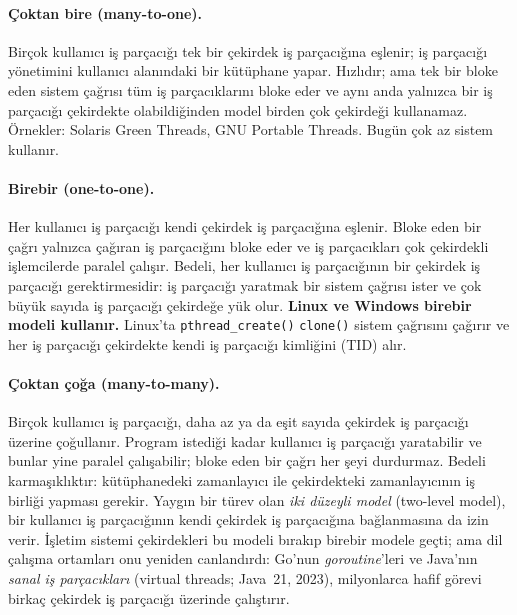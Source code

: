 \documentclass[11pt,a4paper]{article}
\newcommand{\cmd}[1]{\texttt{#1}}
\begin{document}
\paragraph{Çoktan bire (many-to-one).} Birçok kullanıcı iş parçacığı tek bir çekirdek iş parçacığına eşlenir; iş parçacığı yönetimini kullanıcı alanındaki bir kütüphane yapar. Hızlıdır; ama tek bir bloke eden sistem çağrısı tüm iş parçacıklarını bloke eder ve aynı anda yalnızca bir iş parçacığı çekirdekte olabildiğinden model birden çok çekirdeği kullanamaz. Örnekler: Solaris Green Threads, GNU Portable Threads. Bugün çok az sistem kullanır.

\paragraph{Birebir (one-to-one).} Her kullanıcı iş parçacığı kendi çekirdek iş parçacığına eşlenir. Bloke eden bir çağrı yalnızca çağıran iş parçacığını bloke eder ve iş parçacıkları çok çekirdekli işlemcilerde paralel çalışır. Bedeli, her kullanıcı iş parçacığının bir çekirdek iş parçacığı gerektirmesidir: iş parçacığı yaratmak bir sistem çağrısı ister ve çok büyük sayıda iş parçacığı çekirdeğe yük olur. \textbf{Linux ve Windows birebir modeli kullanır.} Linux'ta \cmd{pthread\_create()} \cmd{clone()} sistem çağrısını çağırır ve her iş parçacığı çekirdekte kendi iş parçacığı kimliğini (TID) alır.

\paragraph{Çoktan çoğa (many-to-many).} Birçok kullanıcı iş parçacığı, daha az ya da eşit sayıda çekirdek iş parçacığı üzerine çoğullanır. Program istediği kadar kullanıcı iş parçacığı yaratabilir ve bunlar yine paralel çalışabilir; bloke eden bir çağrı her şeyi durdurmaz. Bedeli karmaşıklıktır: kütüphanedeki zamanlayıcı ile çekirdekteki zamanlayıcının iş birliği yapması gerekir. Yaygın bir türev olan \emph{iki düzeyli model} (two-level model), bir kullanıcı iş parçacığının kendi çekirdek iş parçacığına bağlanmasına da izin verir. İşletim sistemi çekirdekleri bu modeli bırakıp birebir modele geçti; ama dil çalışma ortamları onu yeniden canlandırdı: Go'nun \emph{goroutine}'leri ve Java'nın \emph{sanal iş parçacıkları} (virtual threads; Java~21, 2023), milyonlarca hafif görevi birkaç çekirdek iş parçacığı üzerinde çalıştırır.
\end{document}
